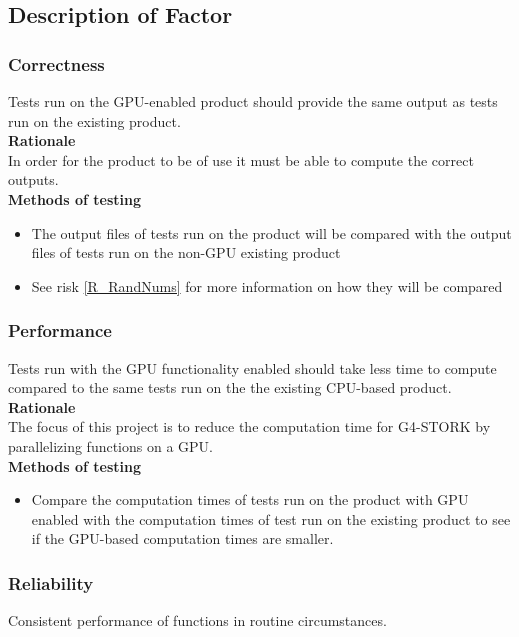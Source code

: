 \documentclass[12pt]{article}
\begin{document}
\subsection{Description of Factor} %
\subsubsection{Correctness}
Tests run on the GPU-enabled product should provide the same output as tests run on the existing product.\\

\textbf{Rationale}\\
In order for the product to be of use it must be able to compute the correct outputs.\\

\textbf{Methods of testing}
\begin{itemize}
\item The output files of tests run on the product will be compared with the output files of tests run on the non-GPU existing product
\item See risk \ref{R_RandNums} for more information on how they will be compared
\end{itemize}
\newpage
\subsubsection{Performance}
Tests run with the GPU functionality enabled should take less time to compute compared to the same tests run on the the existing CPU-based product.\\

\textbf{Rationale}\\
The focus of this project is to reduce the computation time for G4-STORK by parallelizing functions on a GPU.\\

\textbf{Methods of testing}
\begin{itemize}
\item Compare the computation times of tests run on the product with GPU enabled with the computation times of test run on the existing product to see if the GPU-based computation times are smaller.
\end{itemize}

\subsubsection{Reliability}
Consistent performance of functions in routine circumstances.\\
\end{document}
